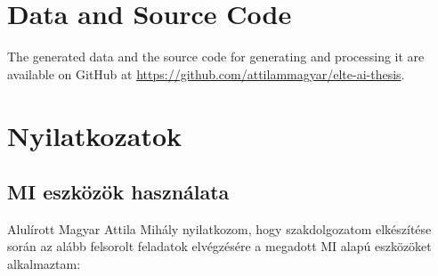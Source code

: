 \documentclass[noindent,nohyp,parspace,titlepage,twoside,12pt]{article}
\begin{document}
\clearpage

  \section{Data and Source Code}

    The generated data and the source code for generating and processing it
    are available on GitHub at \url{https://github.com/attilammagyar/elte-ai-thesis}.

\clearpage

  \nocite{*}
  \printbibliography[heading=bibintoc]

\clearpage

  \section*{Nyilatkozatok}

    \subsection*{MI eszközök használata}

      Alulírott Magyar Attila Mihály nyilatkozom, hogy szakdolgozatom
      elkészítése során az alább felsorolt feladatok elvégzésére a megadott
      MI alapú eszközöket alkalmaztam:
\end{document}
